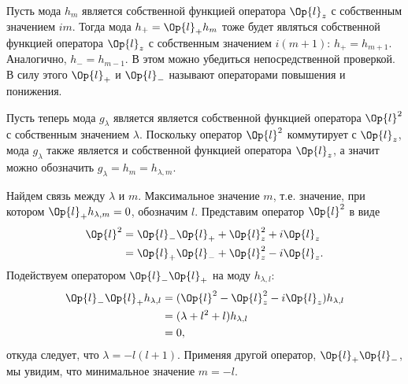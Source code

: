     Пусть мода $h_m$ является собственной функцией оператора $\Op{l}_z$ с собственным значением $i m$. Тогда мода $h_{+} = \Op{l}_{+} h_m$ тоже будет являться собственной функцией оператора $\Op{l}_z$ с собственным значением $i (m + 1)$: $h_{+} = h_{m + 1}$. Аналогично, $h_{-} = h_{m - 1}$. В этом можно убедиться непосредственной проверкой. В силу этого $\Op{l}_{+}$ и $\Op{l}_{-}$ называют операторами повышения и понижения.

    Пусть теперь мода $g_\lambda$ является является собственной функцией оператора $\Op{l}^2$ с собственным значением $\lambda$. Поскольку оператор $\Op{l}^2$ коммутирует с $\Op{l}_z$, мода $g_\lambda$ также является и собственной функцией оператора $\Op{l}_z$, а значит можно обозначить $g_\lambda = h_m = h_{\lambda,m}$.

    Найдем связь между $\lambda$ и $m$. Максимальное значение $m$, т.е. значение, при котором $\Op{l}_{+} h_{\lambda,m} = 0$, обозначим $l$. Представим оператор $\Op{l}^2$ в виде
    \begin{equation}\begin{aligned}
        \Op{l}^2
            &= \Op{l}_{-}\Op{l}_{+} + \Op{l}^2_{z} + i \Op{l}_{z} \\
            &= \Op{l}_{+}\Op{l}_{-} + \Op{l}^2_{z} - i \Op{l}_{z} .
    \end{aligned}\end{equation}
    Подействуем оператором $\Op{l}_{-}\Op{l}_{+}$ на моду $h_{\lambda,l}$:
    \begin{equation}\begin{aligned}
        \Op{l}_{-}\Op{l}_{+} h_{\lambda,l}
            &= (\Op{l}^2 - \Op{l}^2_{z} - i \Op{l}_{z}) h_{\lambda,l} \\
            &= (\lambda + l^2 + l) h_{\lambda,l} \\
            &= 0 ,
    \end{aligned}\end{equation}
    откуда следует, что $\lambda = - l (l + 1)$. Применяя другой оператор, $\Op{l}_{+}\Op{l}_{-}$, мы увидим, что минимальное значение $m = - l$.
